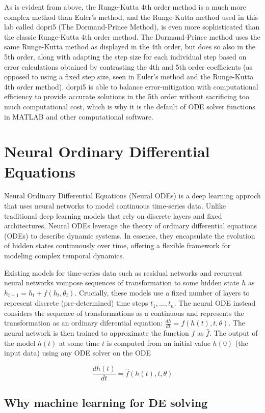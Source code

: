 \documentclass[11pt]{article}
\begin{document}
As is evident from above, the Runge-Kutta 4th order method is a much more complex method than Euler's method, and the Runge-Kutta method used in this lab called dopri5 (The Dormand-Prince Method), is even more sophisticated than the classic Runge-Kutta 4th order method.
The Dormand-Prince method uses the same Runge-Kutta method as displayed in the 4th order, but does so also in the 5th order, along with adapting the step size for each individual step based on error calculations obtained by contrasting the 4th and 5th order coefficients (as opposed to using a fixed step size, seen in Euler's method and the Runge-Kutta 4th order method).
dorpi5 is able to balance error-mitigation with computational efficiency to provide accurate solutions in the 5th order without sacrificing too much computational cost, which is why it is the default of ODE solver functions in MATLAB and other computational software.


\section{Neural Ordinary Differential Equations}

Neural Ordinary Differential Equations (Neural ODEs) is a deep learning approch that uses neural networks to model continuous time-series data. Unlike traditional deep learning models that rely on discrete layers and fixed architectures, Neural ODEs leverage the theory of ordinary differential equations (ODEs) to describe dynamic systems. In essence, they encapsulate the evolution of hidden states continuously over time, offering a flexible framework for modeling complex temporal dynamics.

Existing models for time-series data such as residual networks and recurrent neural networks vompose sequences of transformation to some hidden state $h$ as $h_{t + 1} = h_t + f(h_t, \theta_t)$. Crucially, these models use a fixed number of layers to represent discrete (pre-determined) time steps $t_1, \dots, t_n$. The neural ODE instead considers the sequence of transformations as a continuous and represents the transformation as an ordinary diferential equation: $\frac{dh}{dt} = f(h(t), t, \theta)$. The neural network is then trained to approximate the function $f$ as $\hat f$. The output of the model $h(t)$ at some time $t$ is computed from an initial value $h(0)$ (the input data) using any ODE solver on the ODE

$$
\frac{dh(t)}{dt} = \hat f(h(t), t, \theta)
$$

\subsection{Why machine learning for DE solving}
\end{document}
